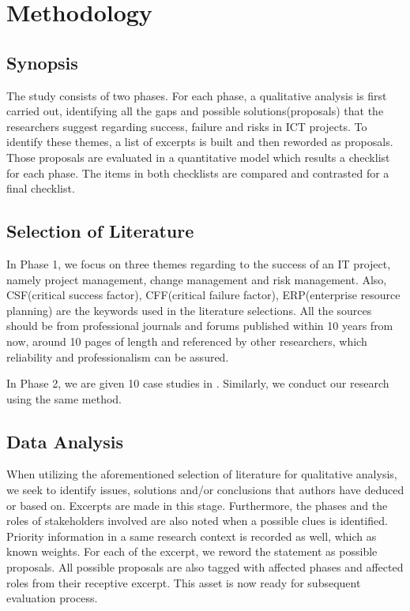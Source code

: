 
\section{Methodology}
\subsection{Synopsis}
The study consists of two phases. For each phase, a qualitative analysis is first carried out, identifying all the gaps and possible solutions(proposals) that the researchers suggest regarding success, failure and risks in ICT projects. To identify these themes, a list of excerpts is built and then reworded as proposals. Those proposals are evaluated in a quantitative model which results a checklist for each phase. The items in both checklists are compared and contrasted for a final checklist.

\subsection{Selection of Literature}
In Phase 1, we focus on three themes regarding to the success of an IT project, namely project management, change management and risk management. Also, CSF(critical success factor), CFF(critical failure factor), ERP(enterprise resource planning) are the keywords used in the literature selections. All the sources should be from professional journals and forums published within 10 years from now, around 10 pages of length and referenced by other researchers, which reliability and professionalism can be assured.

In Phase 2, we are given 10 case studies in . Similarly, we conduct our research using the same method.

\subsection{Data Analysis}
When utilizing the aforementioned selection of literature for qualitative analysis, we seek to identify issues, solutions and/or conclusions that authors have deduced or based on. Excerpts are made in this stage. Furthermore, the phases and the roles of stakeholders involved are also noted when a possible clues is identified. Priority information in a same research context is recorded as well, which as known weights. For each of the excerpt, we reword the statement as possible proposals. All possible proposals are also tagged with affected phases and affected roles from their receptive excerpt. This asset is now ready for subsequent evaluation process.

